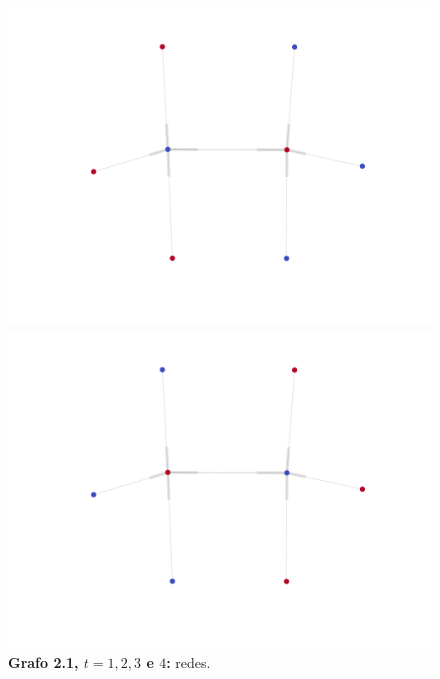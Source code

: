 \begin{frame}
\begin{figure}
\begin{minipage}{4cm}
    \includegraphics[width=\textwidth]{./figures/21N2}
  \end{minipage}
  \begin{minipage}{4cm}
    \includegraphics[width=\textwidth]{./figures/21N1}
  \end{minipage}
  \vspace{5mm}
  \caption*{\textbf{Grafo 2.1, $t = 1, 2, 3$ e $4$:} redes.}
  \end{figure}
\end{frame}

